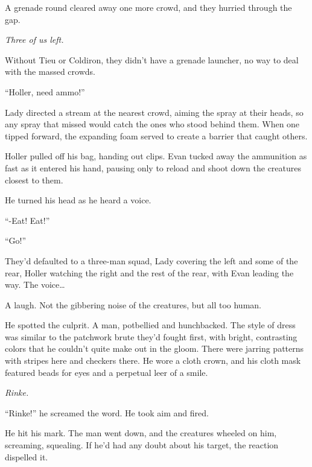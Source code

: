 A grenade round cleared away one more crowd, and they hurried through the gap.



\emph{Three of us left.}



Without Tieu or Coldiron, they didn't have a grenade launcher, no way to deal with the massed crowds.



``Holler, need ammo!''



Lady directed a stream at the nearest crowd, aiming the spray at their heads, so any spray that missed would catch the ones who stood behind them.  When one tipped forward, the expanding foam served to create a barrier that caught others.



Holler pulled off his bag, handing out clips.  Evan tucked away the ammunition as fast as it entered his hand, pausing only to reload and shoot down the creatures closest to them.



He turned his head as he heard a voice.



``-Eat!  Eat!''



``Go!''



They'd defaulted to a three-man squad, Lady covering the left and some of the rear, Holler watching the right and the rest of the rear, with Evan leading the way.  The voice\ldots



A laugh.  Not the gibbering noise of the creatures, but all too human.



He spotted the culprit.  A man, potbellied and hunchbacked.  The style of dress was similar to the patchwork brute they'd fought first, with bright, contrasting colors that he couldn't quite make out in the gloom.  There were jarring patterns with stripes here and checkers there.  He wore a cloth crown, and his cloth mask featured beads for eyes and a perpetual leer of a smile.



\emph{Rinke.}



``Rinke!'' he screamed the word.  He took aim and fired.



He hit his mark.  The man went down, and the creatures wheeled on him, screaming, squealing.  If he'd had any doubt about his target, the reaction dispelled it.



